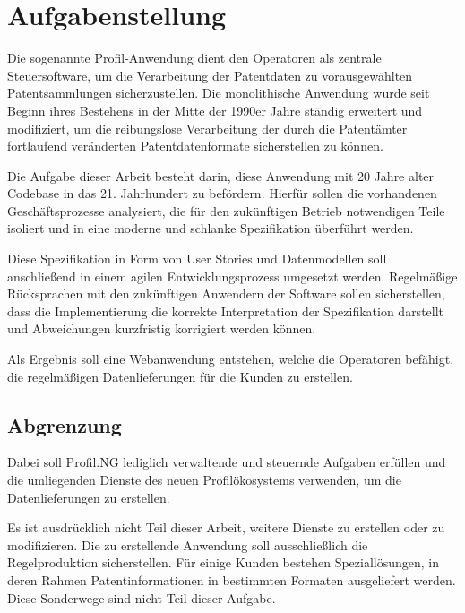 
\chapter{Aufgabenstellung} %

\label{ch:aufgabenstellung} %


Die sogenannte Profil-Anwendung dient den Operatoren als zentrale
Steuersoftware, um die Verarbeitung der Patentdaten zu vorausgewählten
Patentsammlungen sicherzustellen. Die monolithische Anwendung wurde seit Beginn
ihres Bestehens in der Mitte der 1990er Jahre ständig erweitert und modifiziert,
um die reibungslose Verarbeitung der durch die Patentämter fortlaufend
veränderten Patentdatenformate sicherstellen zu können.

Die Aufgabe dieser Arbeit besteht darin, diese Anwendung mit 20 Jahre alter
Codebase in das 21. Jahrhundert zu befördern. Hierfür sollen die vorhandenen
Geschäftsprozesse analysiert, die für den zukünftigen Betrieb notwendigen Teile
isoliert und in eine moderne und schlanke Spezifikation überführt werden.

Diese Spezifikation in Form von User Stories und Datenmodellen soll anschließend
in einem agilen Entwicklungsprozess umgesetzt werden. Regelmäßige Rücksprachen
mit den zukünftigen Anwendern der Software sollen sicherstellen, dass die
Implementierung die korrekte Interpretation der Spezifikation darstellt und
Abweichungen kurzfristig korrigiert werden können.

Als Ergebnis soll eine Webanwendung entstehen, welche die Operatoren befähigt,
die regelmäßigen Datenlieferungen für die Kunden zu erstellen.

\section{Abgrenzung}

Dabei soll Profil.NG lediglich verwaltende und steuernde Aufgaben erfüllen und
die  umliegenden Dienste des neuen Profilökosystems verwenden, um die
Datenlieferungen zu erstellen.

Es ist ausdrücklich nicht Teil dieser Arbeit, weitere Dienste zu erstellen oder
zu modifizieren. Die zu erstellende Anwendung soll ausschließlich die
Regelproduktion sicherstellen. Für einige Kunden bestehen Speziallösungen, in
deren Rahmen Patentinformationen in bestimmten Formaten ausgeliefert werden.
Diese Sonderwege sind nicht Teil dieser Aufgabe.
